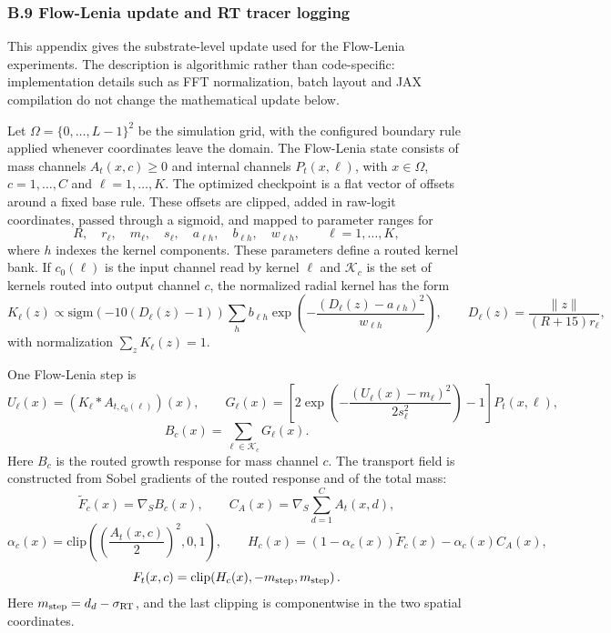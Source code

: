 \subsubsection{B.9 Flow-Lenia update and RT tracer logging}
\label{app:flow-lenia-algorithm}
This appendix gives the substrate-level update used for the Flow-Lenia experiments.  The description is algorithmic rather than code-specific: implementation details such as FFT normalization, batch layout and JAX compilation do not change the mathematical update below.

Let $\Omega=\{0,\ldots,L-1\}^2$ be the simulation grid, with the configured boundary rule applied whenever coordinates leave the domain.  The Flow-Lenia state consists of mass channels $A_t(x,c)\ge 0$ and internal channels $P_t(x,\ell)$, with $x\in\Omega$, $c=1,\ldots,C$ and $\ell=1,\ldots,K$.  The optimized checkpoint is a flat vector of offsets around a fixed base rule.  These offsets are clipped, added in raw-logit coordinates, passed through a sigmoid, and mapped to parameter ranges for
\[
  R,
  \quad r_\ell,
  \quad m_\ell,
  \quad s_\ell,
  \quad a_{\ell h},
  \quad b_{\ell h},
  \quad w_{\ell h},
  \qquad
  \ell=1,\ldots,K,
\]
where $h$ indexes the kernel components.  These parameters define a routed kernel bank.  If $c_0(\ell)$ is the input channel read by kernel $\ell$ and $\mathcal K_c$ is the set of kernels routed into output channel $c$, the normalized radial kernel has the form
\[
  K_\ell(z)
  \propto
  \mathrm{sigm}\!\left(-10(D_\ell(z)-1)\right)
  \sum_h b_{\ell h}
  \exp\!\left(-\frac{(D_\ell(z)-a_{\ell h})^2}{w_{\ell h}}\right),
  \qquad
  D_\ell(z)=\frac{\|z\|}{(R+15)r_\ell},
\]
with normalization $\sum_z K_\ell(z)=1$.

One Flow-Lenia step is
\[
  U_\ell(x) = (K_\ell * A_{t, c_0(\ell)})(x),
  \qquad
  G_\ell(x)=\left[2\exp\!\left(-\frac{(U_\ell(x)-m_\ell)^2}{2s_\ell^2}\right)-1\right]P_t(x,\ell),
\]
\[
  B_c(x)=\sum_{\ell\in\mathcal K_c}G_\ell(x).
\]
Here $B_c$ is the routed growth response for mass channel $c$.  The transport field is constructed from Sobel gradients of the routed response and of the total mass:
\[
  \widetilde F_c(x)=\nabla_S B_c(x),
  \qquad
  C_A(x)=\nabla_S\sum_{d=1}^C A_t(x,d),
\]
\[
  \alpha_c(x)=\mathrm{clip}\!\left(\left(\frac{A_t(x,c)}{2}\right)^2,0,1\right),
  \qquad
  H_c(x)=(1-\alpha_c(x))\widetilde F_c(x)-\alpha_c(x)C_A(x),
\]
\[
  F_t(x,c)=\mathrm{clip}\!\left(H_c(x),-m_{\rm step},m_{\rm step}\right).
\]
Here $m_{\rm step}=d_d-\sigma_{\rm RT}$, and the last clipping is componentwise in the two spatial coordinates.

